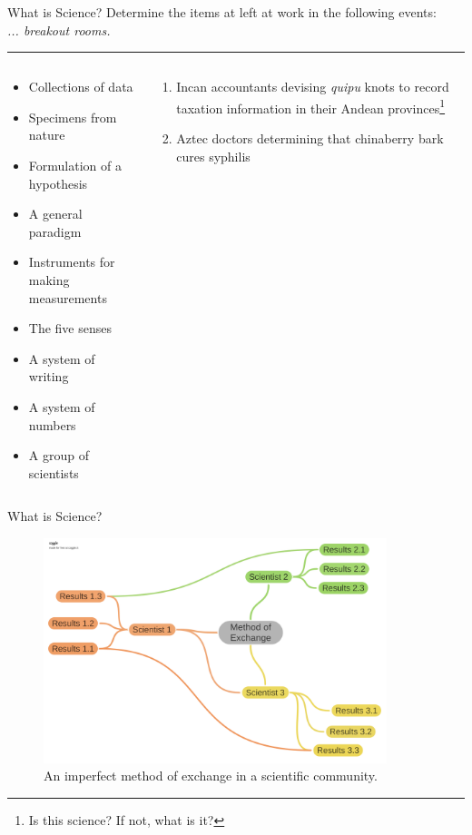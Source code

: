 \documentclass{beamer}
\begin{document}
\begin{frame}{What is Science?}
\small
Determine the items at left at work in the following events: \\ \textit{... breakout rooms.}
\rule{10cm}{0.05cm}
\begin{columns}
\begin{column}{0.65\textwidth}
\begin{itemize}
\item Collections of data
\item Specimens from nature
\item Formulation of a hypothesis
\item A general paradigm
\item Instruments for making measurements
\item The five senses
\item A system of writing
\item A system of numbers
\item A group of scientists
\end{itemize}
\end{column}
\begin{column}{0.35\textwidth}
\begin{enumerate}
\item Incan accountants devising \textit{quipu} knots to record taxation information in their Andean provinces\footnote{Is this science?  If not, what is it?}
\item Aztec doctors determining that chinaberry bark cures syphilis
\end{enumerate}
\end{column}
\end{columns}
\end{frame}

\begin{frame}{What is Science?}
\begin{figure}
\centering
\includegraphics[width=10cm]{figures/ScientificExchange.pdf}
\caption{An imperfect method of exchange in a scientific community.}
\end{figure}
\end{frame}
\end{document}
